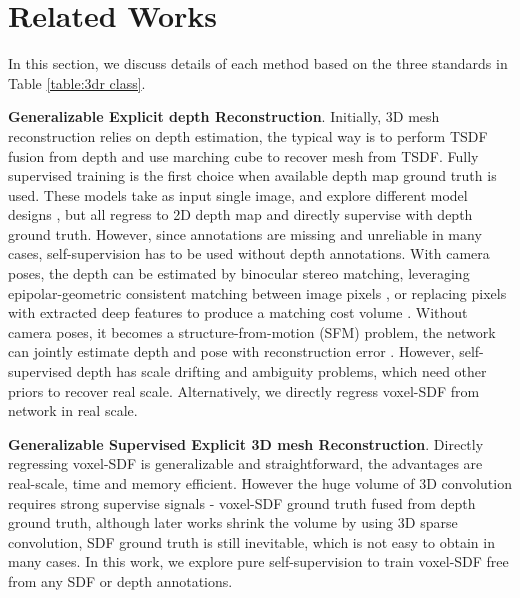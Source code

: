 \section{Related Works}
\label{sec:related_works}

\iffalse
To show the difference and improvement of our work to other 3DR works, we measure 3DR into three major standards based on their training strategies(supervised/unsupervised), generalization abilities, and representations(explicit/implicit), as shown in Table \ref{table:3dr class}.
\fi

In this section, we discuss details of each method based on the three standards in Table \ref{table:3dr class}. 

\noindent
\textbf{Generalizable Explicit depth Reconstruction}.
Initially, 3D mesh reconstruction relies on depth estimation, the typical way is to perform TSDF fusion from depth and use marching cube to recover mesh from TSDF. Fully supervised training is the first choice when available depth map ground truth is used. These models take as input single image, and explore different model designs \cite{deepv2d,CNMNet,neuralrgb,mvdepthnet,dpsnet}, but all regress to 2D depth map and directly supervise with depth ground truth. However, since  annotations are missing and unreliable in many cases, self-supervision has to be used without depth annotations. With camera poses, the depth can be estimated by binocular stereo matching, leveraging epipolar-geometric consistent matching between image pixels \cite{mvdepthnet}, or replacing pixels with extracted deep features to produce a matching cost volume \cite{ESTDepth, deepvideomvs}. Without camera poses, it becomes a structure-from-motion (SFM) problem, the network can jointly estimate depth and pose with reconstruction error \cite{monoindoor,p2net,movingindoor,structdepth,monodepth2}. However, self-supervised depth has scale drifting and ambiguity problems, which need other priors to recover real scale. Alternatively, we directly regress voxel-SDF from network in real scale.

\noindent
\textbf{Generalizable Supervised Explicit 3D mesh Reconstruction}.
Directly regressing voxel-SDF is generalizable and straightforward, the advantages are real-scale, time and memory efficient. However the huge volume of 3D convolution \cite{atlas} requires strong supervise signals - voxel-SDF ground truth fused from depth ground truth, although later works \cite{neucon, vortx} shrink the volume by using 3D sparse convolution, SDF ground truth is still inevitable, which is not easy to obtain in many cases. In this work, we explore pure self-supervision to train voxel-SDF free from any SDF or depth annotations.


